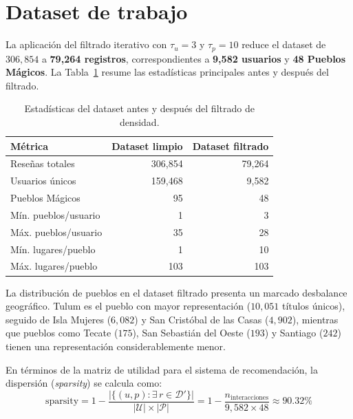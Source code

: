 \section{Dataset de trabajo} \label{sec:working_dataset}

La aplicación del filtrado iterativo con $\tau_u = 3$ y $\tau_p = 10$ reduce el dataset de $306{,}854$ a \textbf{79,264 registros}, correspondientes a \textbf{9,582 usuarios} y \textbf{48 Pueblos Mágicos}. La Tabla~\ref{tab:dataset_stats} resume las estadísticas principales antes y después del filtrado.

\begin{table}[ht]
	\centering
	\caption{Estadísticas del dataset antes y después del filtrado de densidad.}
	\label{tab:dataset_stats}
	\begin{tabular}{lrr}
		\toprule
		\textbf{Métrica}     & \textbf{Dataset limpio} & \textbf{Dataset filtrado} \\
		\midrule
		Reseñas totales      & 306,854                 & 79,264                    \\
		Usuarios únicos      & 159,468                 & 9,582                     \\
		Pueblos Mágicos      & 95                      & 48                        \\
		Mín. pueblos/usuario & 1                       & 3                         \\
		Máx. pueblos/usuario & 35                      & 28                        \\
		Mín. lugares/pueblo  & 1                       & 10                        \\
		Máx. lugares/pueblo  & 103                     & 103                       \\
		\bottomrule
	\end{tabular}
\end{table}

La distribución de pueblos en el dataset filtrado presenta un marcado desbalance geográfico. Tulum es el pueblo con mayor representación ($10{,}051$ títulos únicos), seguido de Isla Mujeres ($6{,}082$) y San Cristóbal de las Casas ($4{,}902$), mientras que pueblos como Tecate ($175$), San Sebastián del Oeste ($193$) y Santiago ($242$) tienen una representación considerablemente menor.

En términos de la matriz de utilidad para el sistema de recomendación, la dispersión (\textit{sparsity}) se calcula como:
\begin{equation} \label{eq:sparsity}
	\text{sparsity} = 1 - \frac{|\{(u, p) : \exists\, r \in \mathcal{D}'\}|}{|\mathcal{U}| \times |\mathcal{P}|} = 1 - \frac{n_{\text{interacciones}}}{9{,}582 \times 48} \approx 90.32\%
\end{equation}

